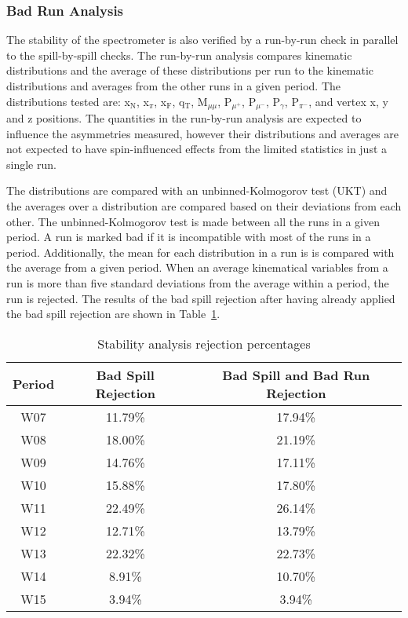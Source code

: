 \subsubsection{Bad Run Analysis}
The stability of the spectrometer is also verified by a run-by-run check in
parallel to the spill-by-spill checks.  The run-by-run analysis compares
kinematic distributions and the average of these distributions per run to the
kinematic distributions and averages from the other runs in a given period.  The
distributions tested are: x$_{\mathrm{N}}$, x$_{\pi}$, x$_{\mathrm{F}}$,
q$_{\mathrm{T}}$, M$_{\mu\mu}$, P$_{\mu^+}$, P$_{\mu^-}$, P$_{\gamma}$,
P$_{\pi^-}$, and vertex x, y and z positions.  The quantities in the run-by-run
analysis are expected to influence the asymmetries measured, however their
distributions and averages are not expected to have spin-influenced effects from
the limited statistics in just a single run.

The distributions are compared with an unbinned-Kolmogorov test (UKT) and the
averages over a distribution are compared based on their deviations from each
other.  The unbinned-Kolmogorov test is made between all the runs in a given
period.  A run is marked bad if it is incompatible with most of the runs in a
period.  Additionally, the mean for each distribution in a run is is compared
with the average from a given period.  When an average kinematical variables
from a run is more than five standard deviations from the average within a
period, the run is rejected.  The results of the bad spill rejection after
having already applied the bad spill rejection are shown in
Table~\ref{tab::badspillpercent}.

\begin{table}[h!t]
  \centering
  \begin{tabular}{ |c|c|c| }
    \hline \textbf{Period}& \textbf{Bad Spill Rejection}&
    \textbf{Bad Spill and Bad Run Rejection} \\ \hline \hline
    
    W07& 11.79\%& 17.94\%\\ \hline
    W08& 18.00\%& 21.19\%\\ \hline
    W09& 14.76\%& 17.11\%\\ \hline
    W10& 15.88\%& 17.80\%\\ \hline
    W11& 22.49\%& 26.14\%\\ \hline
    W12& 12.71\%& 13.79\%\\ \hline
    W13& 22.32\%& 22.73\%\\ \hline
    W14& 8.91\%& 10.70\%\\ \hline
    W15& 3.94\%& 3.94\%\\ \hline

  \end{tabular}
  \caption{Stability analysis rejection percentages}
  \label{tab::badspillpercent}
\end{table}

